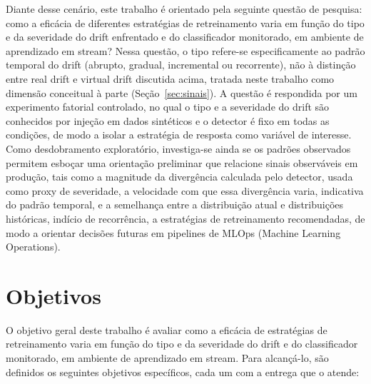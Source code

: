 Diante desse cenário, este trabalho é orientado pela seguinte questão de
pesquisa: como a eficácia de diferentes estratégias de retreinamento varia em
função do tipo e da severidade do drift enfrentado e do classificador
monitorado, em ambiente de aprendizado em stream? Nessa questão, o tipo
refere-se especificamente ao padrão temporal do drift (abrupto, gradual,
incremental ou recorrente), não à distinção entre real drift e virtual
drift discutida acima, tratada neste trabalho como dimensão conceitual à
parte (Seção~\ref{sec:sinais}). A questão é respondida por
um experimento fatorial controlado, no qual o tipo e a severidade do drift
são conhecidos por injeção em dados sintéticos e o detector é fixo em todas
as condições, de modo a isolar a estratégia de resposta como variável de
interesse. Como desdobramento exploratório, investiga-se ainda se os padrões
observados permitem esboçar uma orientação preliminar que relacione sinais
observáveis em produção, tais como a magnitude da divergência calculada pelo
detector, usada como proxy de severidade, a velocidade com que essa
divergência varia, indicativa do padrão temporal, e a semelhança entre a
distribuição atual e distribuições históricas, indício de recorrência, a
estratégias de retreinamento recomendadas, de modo a orientar decisões
futuras em pipelines de MLOps (Machine Learning Operations).

\section*{Objetivos}

O objetivo geral deste trabalho é avaliar como a eficácia de estratégias de
retreinamento varia em função do tipo e da severidade do drift e do
classificador monitorado, em ambiente de aprendizado em stream. Para
alcançá-lo, são definidos os seguintes objetivos específicos, cada um com a
entrega que o atende:

